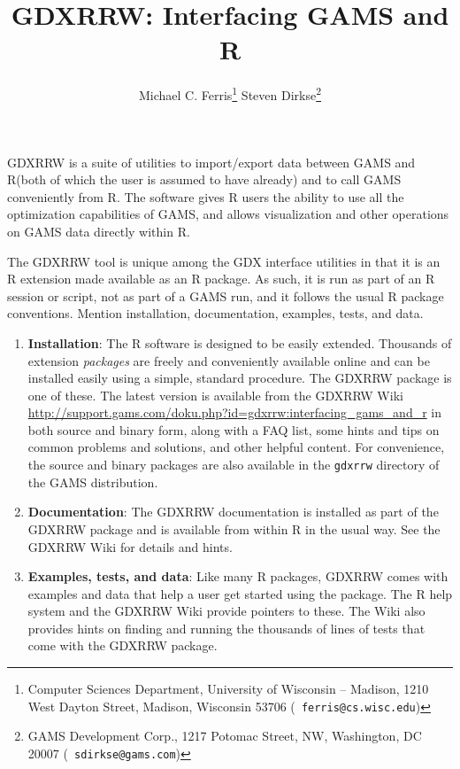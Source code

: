 \documentclass{article}
\newcommand{\gdxrrw}{GDXRRW\xspace}
\newcommand{\R}{R\xspace}
\newcommand{\gams}{GAMS\xspace}
\newcommand{\gdx}{GDX\xspace}
\begin{document}
\title{\gdxrrw: Interfacing \gams and \R}
  \author{Michael C. Ferris\thanks{ Computer
    Sciences Department, University of Wisconsin -- Madison, 1210 West
    Dayton Street, Madison, Wisconsin 53706 ({\tt
    ferris@cs.wisc.edu})}
    \space \space Steven Dirkse\thanks { GAMS Development Corp.,
    1217 Potomac Street, NW,  Washington, DC  20007 ({\tt
    sdirkse@gams.com})}  }
\maketitle

\gdxrrw is a suite of utilities to import/export data between \gams
and \R (both of which the user is assumed to have already) and to
call \gams conveniently from \R.  The software
gives \R users the ability to use all the optimization capabilities of
\gams, and allows visualization and other operations on \gams data
directly within \R.

The \gdxrrw tool is unique among the \gdx interface utilities in that
it is an \R extension made available as an \R package.  As such, it is
run as part of an R session or script, not as part of a GAMS run, and it
follows the usual \R package conventions.  Mention installation,
documentation, examples, tests, and data.
\begin{enumerate}
  \item {\bf Installation}: The \R software is designed to be easily
    extended.  Thousands of extension \emph{packages} are freely and
    conveniently available online and can be installed easily using a simple, standard
    procedure.  The \gdxrrw package is one of these.  The latest
    version is available from the \gdxrrw Wiki
    \url{http://support.gams.com/doku.php?id=gdxrrw:interfacing_gams_and_r} in both source and binary
    form, along with a FAQ list,
    some hints and tips on common problems and solutions, and other
    helpful content.  For convenience, the source and binary packages
    are also available in the {\tt gdxrrw} directory of the GAMS distribution.
  \item {\bf Documentation}: The \gdxrrw documentation is installed as
    part of the \gdxrrw package and is available from within \R in the
    usual way.  See the \gdxrrw Wiki for details and hints.
  \item {\bf Examples, tests, and data}: Like many \R packages,
    \gdxrrw comes with examples and data that help a user get started
    using the package.  The \R help system and the \gdxrrw Wiki
    provide pointers to these.  The Wiki also provides hints on
    finding and running the thousands of lines of tests that come with
    the \gdxrrw package.
\end{enumerate}
\end{document}
